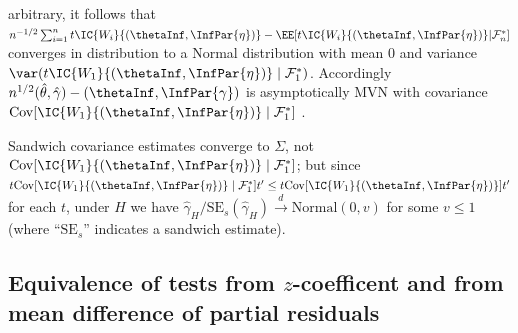   arbitrary, it follows that $n^{-1/2}\sum_{i=1}^{n}  t \IC{W_{i}}{(\thetaInf,
    \InfPar{\eta})} - \EE[  t  \IC{W_{i}}{(\thetaInf,
    \InfPar{\eta})}\vert  \mathcal{F}_{n}^{*} ]$ converges in
  distribution to a Normal distribution with mean 0 and
  variance $\var( t \IC{W_{1}}{(\thetaInf,
    \InfPar{\eta})} \mid \mathcal{F}_{1}^{*} )$.  Accordingly
  $n^{1/2}(\hat\theta, \hat\gamma) - (\thetaInf, \InfPar{\gamma})$ is
  asymptotically MVN with covariance
$\mathrm{Cov}[\IC{W_{1}}{(\thetaInf,
    \InfPar{\eta})} \mid \mathcal{F}_{1}^{*} ]$%
.

Sandwich covariance estimates converge to $\Sigma$, not
$\mathrm{Cov}[\IC{W_{1}}{(\thetaInf, \InfPar{\eta})} \mid\mathcal{F}_{1}^{*} ]$;
but since
$t \mathrm{Cov}[\IC{W_{1}}{(\thetaInf, \InfPar{\eta})} \mid \mathcal{F}_{1}^{*} ] t'
\leq t \mathrm{Cov}[\IC{W_{1}}{(\thetaInf, \InfPar{\eta})}] t'$ for
each $t$, under $H$ we have $\hat{\gamma}_{H}/\mathrm{SE}_{s}(\hat{\gamma}_{H})
\stackrel{d}{\rightarrow} \mathrm{Normal}(0, v)$ for some $v\leq 1$ (where ``$\mathrm{SE}_{s}$'' indicates a sandwich estimate).


\subsection{Equivalence of tests from $z$-coefficent and from mean difference of partial residuals} \label{sec:suppl-s-refs}

